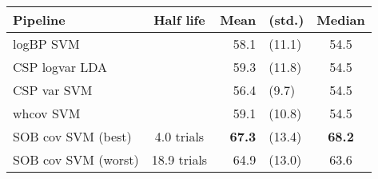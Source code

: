 \begin{tabular}{l c r@{ }l c}
\toprule
Pipeline & Half life & Mean & (std.) & Median\\
\midrule
logBP SVM && 58.1 & (11.1) & 54.5\\
CSP logvar LDA && 59.3 & (11.8) & 54.5\\
CSP var SVM && 56.4 & (9.7) & 54.5\\
whcov SVM && 59.1 & (10.8) & 54.5\\
SOB cov SVM (best) & 4.0 trials & \textbf{67.3} & (13.4) & \textbf{68.2}\\
SOB cov SVM (worst) & 18.9 trials & 64.9 & (13.0) & 63.6\\
\bottomrule
\end{tabular}
